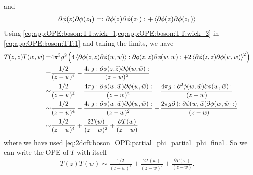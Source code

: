 \documentclass[10pt]{article}
\begin{document}
and
\begin{align}
    \partial\phi(z)\partial\phi(z_1)=:\partial\phi(z)\partial\phi(z_1):+\expval{\partial\phi(z)\partial\phi(z_1)}\label{eq:app:OPE:boson:TT:wick_2}
\end{align}
Using \cref{eq:app:OPE:boson:TT:wick_1,eq:app:OPE:boson:TT:wick_2} in \cref{eq:app:OPE:boson:TT:1} and taking the limits, we have
\begin{align}
    T(z,\bar{z})T(w,\bar{w})= & 4\pi^2 g^2\left(4\expval{\partial\phi(z,\bar{z})\partial\phi(w,\bar{w})}:\partial\phi(z,\bar{z})\partial\phi(w,\bar{w}):+2\expval{\partial\phi(z,\bar{z})\partial\phi(w,\bar{w})}^2\right)\notag   \\
    =                         & \frac{1/2}{(z-w)^4}-\frac{4\pi g:\partial\phi(z,\bar{z})\partial\phi(w,\bar{w}):}{(z-w)^2}\notag                                                                                           \\
    \sim                      & \frac{1/2}{(z-w)^4}-\frac{4\pi g:\partial\phi(w,\bar{w})\partial\phi(w,\bar{w}):}{(z-w)^2}-\frac{4\pi g:\partial^2\phi(w,\bar{w})\partial\phi(w,\bar{w}):}{(z-w)}\notag                    \\
    \sim                      & \frac{1/2}{(z-w)^4}-\frac{4\pi g:\partial\phi(w,\bar{w})\partial\phi(w,\bar{w}):}{(z-w)^2}-\frac{2\pi g\partial\left(:\partial\phi(w,\bar{w})\partial\phi(w,\bar{w}):\right)}{(z-w)}\notag \\
    \sim                      & \frac{1/2}{(z-w)^4}+\frac{2T(w)}{(z-w)^2}+\frac{\partial T(w)}{(z-w)}
\end{align}
where we have used \cref{eq:2dcft:boson_OPE:partial_phi_partial_phi_final}.
So we can write the OPE of $T$ with itself
\begin{align}
    T(z)T(w)\sim\frac{1/2}{(z-w)^4}+\frac{2T(w)}{(z-w)^2}+\frac{\partial T(w)}{(z-w)}.
\end{align}


\clearpage


\end{document}
